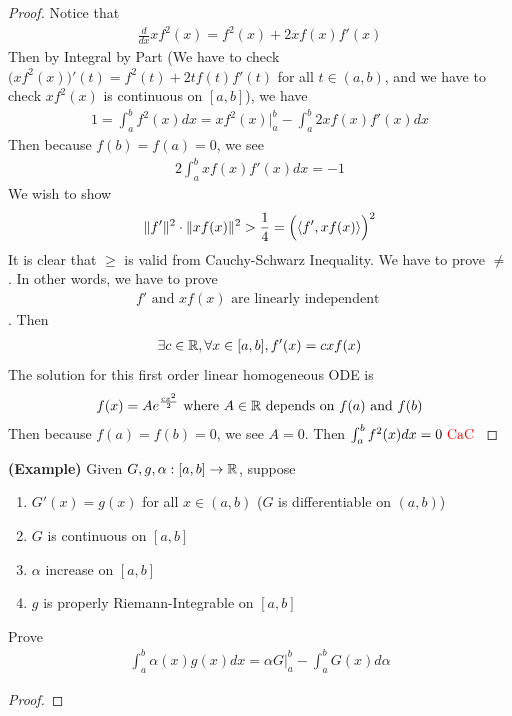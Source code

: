 \documentclass{report}
\begin{document}
\begin{proof}
Notice that 
\begin{align*}
  \frac{d}{dx} xf^2(x)=f^2(x)+2xf(x)f'(x)
\end{align*}
Then by Integral by Part (We have to check $\big(xf^2(x) \big)'(t)=f^2(t)+2tf(t)f'(t)$ for all $t \in (a,b)$, and we have to check $xf^2(x)$ is continuous on $[a,b]$), we have 
\begin{align*}
1=\int_a^b f^2(x)dx=xf^2(x)\Big|_a^b - \int_a^b 2xf(x)f'(x)dx
\end{align*}
Then because $f(b)=f(a)=0$, we see 
\begin{align*}
2 \int_a^b xf(x)f'(x)dx=-1 
\end{align*}
We wish to show 
\begin{align*}
\| f' \|^2 \cdot \| x f(x) \|^2> \frac{1}{4}= \Big( \langle f',xf(x)\rangle \Big)^2
\end{align*}
It is clear that $\geq $ is valid from Cauchy-Schwarz Inequality. We have to prove $\neq $. In other words, we have to prove 
\begin{align*}
f'\text{ and }xf(x)\text{ are linearly independent }
\end{align*}
. Then 
 \begin{align*}
\exists c\in\mathbb{R}, \forall x\in [a,b], f'(x)=cxf(x)
\end{align*}
The solution for this first order linear homogeneous ODE is 
\begin{align*}
f(x)=Ae^{\frac{cx^2}{2}} \text{ where $A\in\mathbb{R}$ depends on $f(a)$ and $f(b)$}
\end{align*}
Then because $f(a)=f(b)=0$, we see $A=0$. Then  $\int_a^b f^2(x)dx=0\text{ \textcolor{red}{CaC} }$
\end{proof}
\begin{theorem}
\textbf{(Example)} Given $G,g,\alpha :[a,b]\rightarrow \mathbb{R}$, suppose
\begin{enumerate}[label=(\alph*)]
  \item $G'(x)=g(x)$ for all $x \in (a,b)$ ($G$ is differentiable  on  $(a,b)$)
  \item $G$ is continuous on  $[a,b]$
  \item $\alpha $ increase on $[a,b]$
  \item $g$ is properly Riemann-Integrable on  $[a,b]$
\end{enumerate}
Prove 
\begin{align*}
\int_a^b \alpha (x)g(x)dx= \alpha G\Big|_a^b - \int_a^b G(x)d\alpha  
\end{align*}
\end{theorem}
\begin{proof}

\end{proof}
\end{document}
